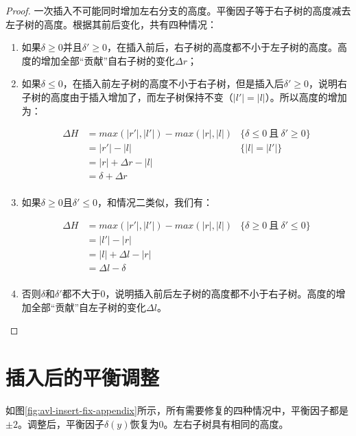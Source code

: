 \documentclass[b5paper]{ctexart}
\begin{document}
\begin{proof}
一次插入不可能同时增加左右分支的高度。平衡因子等于右子树的高度减去左子树的高度。根据其前后变化，共有四种情况：

\begin{enumerate}
\item 如果$\delta \geq 0$并且$\delta' \geq 0$，在插入前后，右子树的高度都不小于左子树的高度。高度的增加全部“贡献”自右子树的变化$\Delta r$；

\item 如果$\delta \leq 0$，在插入前左子树的高度不小于右子树，但是插入后$\delta' \geq 0$，说明右子树的高度由于插入增加了，而左子树保持不变（$|l'|=|l|$）。所以高度的增加为：

\[
\begin{array}{rll}
\Delta H & = max(|r'|, |l'|) - max (|r|, |l|) & \{\delta \leq 0\ \text{且}\ \delta' \geq 0 \}\\
         & = |r'|-|l| & \{|l|=|l'|\}\\
         & = |r|+\Delta r - |l| & \\
         & = \delta + \Delta r & \\
\end{array}
\]

\item 如果$\delta \geq 0$且$\delta' \leq 0$，和情况二类似，我们有：

\[
\begin{array}{rll}
\Delta H & = max(|r'|, |l'|) - max (|r|, |l|) & \{\delta \geq 0\ \text{且}\ \delta' \leq 0 \}\\
         & = |l'|-|r| & \\
         & = |l| + \Delta l - |r| & \\
         & = \Delta l - \delta & \\
\end{array}
\]

\item 否则$\delta$和$\delta'$都不大于0，说明插入前后左子树的高度都不小于右子树。高度的增加全部“贡献”自左子树的变化$\Delta l$。
\end{enumerate}

\end{proof}

\section{插入后的平衡调整}

如图\cref{fig:avl-insert-fix-appendix}所示，所有需要修复的四种情况中，平衡因子都是$\pm 2$。调整后，平衡因子$\delta(y)$恢复为0。左右子树具有相同的高度。
\end{document}
